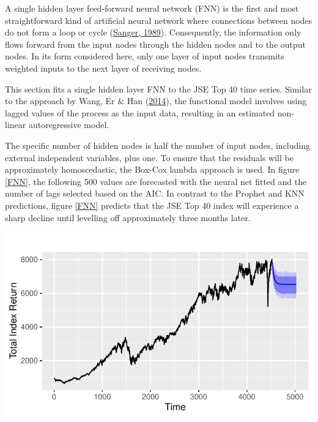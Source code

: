 \documentclass[11pt,preprint, authoryear]{elsarticle}
\let\origfigure\figure
\let\endorigfigure\endfigure
\renewenvironment{figure}[1][2] {
    \expandafter\origfigure\expandafter[H]
} {
    \endorigfigure
}
\numberwithin{equation}{section}
\numberwithin{figure}{section}
\numberwithin{table}{section}
\begin{document}
A single hidden layer feed-forward neural network (FNN) is the first and
most straightforward kind of artificial neural network where connections
between nodes do not form a loop or cycle
(\protect\hyperlink{ref-sanger1989}{Sanger, 1989}). Consequently, the
information only flows forward from the input nodes through the hidden
nodes and to the output nodes. In its form considered here, only one
layer of input nodes transmits weighted inputs to the next layer of
receiving nodes.

This section fits a single hidden layer FNN to the JSE Top 40 time
series. Similar to the approach by Wang, Er \& Han
(\protect\hyperlink{ref-wang2014}{2014}), the functional model involves
using lagged values of the process as the input data, resulting in an
estimated non-linear autoregressive model.

The specific number of hidden nodes is half the number of input nodes,
including external independent variables, plus one. To ensure that the
residuals will be approximately homoscedastic, the Box-Cox lambda
approach is used. In figure \ref{FNN}, the following 500 values are
forecasted with the neural net fitted and the number of lags selected
based on the AIC. In contrast to the Prophet and KNN predictions, figure
\ref{FNN} predicts that the JSE Top 40 index will experience a sharp
decline until levelling off approximately three months later.

\begin{figure}[H]

{\centering \includegraphics{JSE_Top40_Predictions_Using_Machine_Learning_files/figure-latex/unnamed-chunk-8-1} 

}

\caption{Forecasted JSE Top 40 index using the feed-forward neural network.\label{FNN}}\label{fig:unnamed-chunk-8}
\end{figure}
\end{document}
